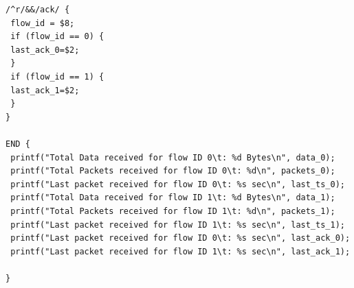 \documentclass{article}%
\begin{document}
\begin{itemize}
\begin{verbatim}
/^r/&&/ack/ {
 flow_id = $8;
 if (flow_id == 0) {
 last_ack_0=$2;
 }
 if (flow_id == 1) {
 last_ack_1=$2;
 }
}

END {
 printf("Total Data received for flow ID 0\t: %d Bytes\n", data_0);
 printf("Total Packets received for flow ID 0\t: %d\n", packets_0);
 printf("Last packet received for flow ID 0\t: %s sec\n", last_ts_0);
 printf("Total Data received for flow ID 1\t: %d Bytes\n", data_1);
 printf("Total Packets received for flow ID 1\t: %d\n", packets_1);
 printf("Last packet received for flow ID 1\t: %s sec\n", last_ts_1);
 printf("Last packet received for flow ID 0\t: %s sec\n", last_ack_0);
 printf("Last packet received for flow ID 1\t: %s sec\n", last_ack_1);

}
\end{verbatim}

\end{itemize}
\end{document}
